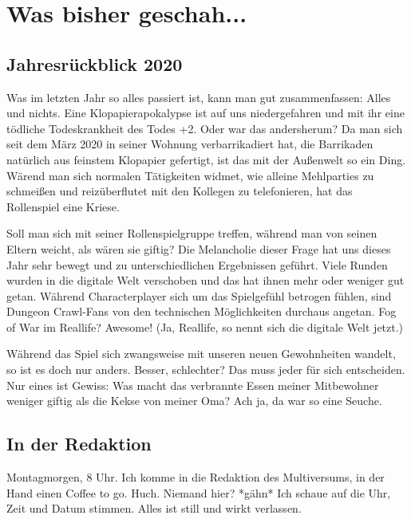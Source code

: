 \documentclass[final]{multiversum}
\begin{document}
\makemultititle
%

\section{Was bisher geschah...}

\subsection{Jahresrückblick 2020}
Was im letzten Jahr so alles passiert ist, kann man gut zusammenfassen: Alles und nichts.
Eine Klopapierapokalypse ist auf uns niedergefahren und mit ihr eine tödliche Todeskrankheit des Todes +2.
Oder war das andersherum?
Da man sich seit dem März 2020 in seiner Wohnung verbarrikadiert hat, die Barrikaden natürlich aus feinstem Klopapier gefertigt, ist das mit der Außenwelt so ein Ding.
Wärend man sich normalen Tätigkeiten widmet, wie alleine Mehlparties zu schmeißen und reizüberflutet mit den Kollegen zu telefonieren, hat das Rollenspiel eine Kriese.

Soll man sich mit seiner Rollenspielgruppe treffen, während man von seinen Eltern weicht, als wären sie giftig?
Die Melancholie dieser Frage hat uns dieses Jahr sehr bewegt und zu unterschiedlichen Ergebnissen geführt.
Viele Runden wurden in die digitale Welt verschoben und das hat ihnen mehr oder weniger gut getan.
Während Characterplayer sich um das Spielgefühl betrogen fühlen, sind Dungeon Crawl-Fans von den technischen Möglichkeiten durchaus angetan.
Fog of War im Reallife? Awesome! (Ja, Reallife, so nennt sich die digitale Welt jetzt.)

Während das Spiel sich zwangsweise mit unseren neuen Gewohnheiten wandelt, so ist es doch nur anders.
Besser, schlechter? Das muss jeder für sich entscheiden.
Nur eines ist Gewiss:
Was macht das verbrannte Essen meiner Mitbewohner weniger giftig als die Kekse von meiner Oma?
Ach ja, da war so eine Seuche.

\subsection{In der Redaktion}
Montagmorgen, 8 Uhr.
Ich komme in die Redaktion des Multiversums, in der Hand einen Coffee to go.
Huch. Niemand hier? *gähn*
Ich schaue auf die Uhr, Zeit und Datum stimmen.
Alles ist still und wirkt verlassen.
\end{document}
